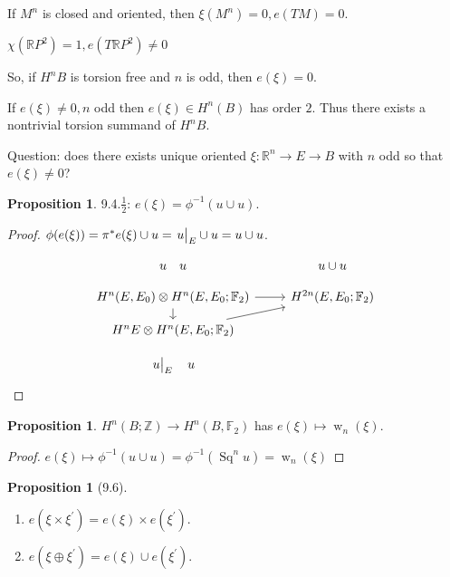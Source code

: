 \documentclass{article}
\theoremstyle{definition}
\newtheorem{proposition}[theorem]{Proposition}
\begin{document}
    If \(M^n\) is closed and oriented, then \(\xi(M^n) = 0, e(TM) = 0\).
    
    \(\chi(\mathbb{R}P^2) = 1, e(T \mathbb{R} P^2) \neq 0\) 

    So, if \(H^n B \) is torsion free and \(n\) is odd, then \(e(\xi) = 0\).

    If \(e(\xi) \neq 0, n\) odd then \(e(\xi) \in H^n(B)\) has order \(2\). Thus there exists a nontrivial torsion summand of \(H^n B\).

    Question: does there exists unique oriented \(\xi: \mathbb{R}^n \to E \to B\) with \(n\) odd so that \(e(\xi) \neq 0\)?

    \begin{proposition}
        9.4.\(\frac{1}{2}\): \(e(\xi) = \phi ^{-1} (u \cup u)\).
    \end{proposition}

    \begin{proof}
        \(\phi(e(\xi)) = \pi^{\ast} e(\xi) \cup u = \eval{u}_{E} \cup u = u \cup u\).

        \[
            \begin{tikzcd}[row sep = small]
                u \quad u & u \cup u \\
                H^n(E,E_0) \otimes H^n(E, E_0; \mathbb{F}_2) \ar[d] \ar[r] & H^{2n}(E,E_0; \mathbb{F}_2) \\ H^n E \otimes H^n(E,E_0; \mathbb{F}_2) \ar[ru] \\ \eval{u}_{E} \quad u
            \end{tikzcd}
        \]
    \end{proof}

    \begin{proposition}
        \(H^n(B;\mathbb{Z}) \to H^n(B,\mathbb{F}_2)\) has \(e(\xi) \mapsto \operatorname{w}_n(\xi)\).
    \end{proposition}

    \begin{proof}
        \(e(\xi) \mapsto \phi ^{-1} (u \cup u) = \phi ^{-1} (\operatorname{Sq}^n u) = \operatorname{w}_n(\xi)\) 
    \end{proof}

    \begin{proposition}
        [9.6]

        \begin{enumerate}[label=\alph*)]
            \item \(e(\xi \times \xi^{\prime})= e(\xi) \times e(\xi^{\prime})\).
            \item \(e(\xi \oplus \xi^{\prime}) = e(\xi) \cup e(\xi^{\prime})\).
        \end{enumerate} 
    \end{proposition}
\end{document}
